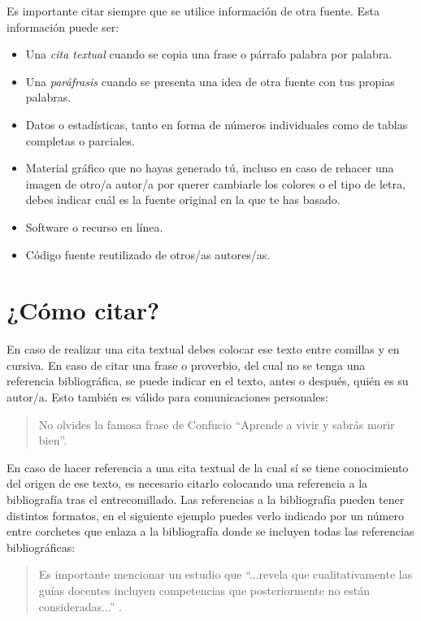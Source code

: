Es importante citar siempre que se utilice información de otra fuente. Esta información puede ser:

\begin{itemize}
    \item Una {\em cita textual} cuando se copia una frase o párrafo palabra por palabra.
    \item Una {\em paráfrasis} cuando se presenta una idea de otra fuente con tus propias palabras.
    \item Datos o estadísticas, tanto en forma de números individuales como de tablas completas o parciales.
    \item Material gráfico que no hayas generado tú, incluso en caso de rehacer una imagen de otro/a autor/a por querer cambiarle los colores o el tipo de letra, debes indicar cuál es la fuente original en la que te has basado. 
    \item Software o recurso en línea.
    \item Código fuente reutilizado de otros/as autores/as.
\end{itemize}

\section{¿Cómo citar?}

En caso de realizar una cita textual debes colocar ese texto entre comillas y en cursiva. En caso de citar una frase o proverbio, del cual no se tenga una referencia bibliográfica, se puede indicar en el texto, antes o después, quién es su autor/a. Esto también es válido para comunicaciones personales:

\begin{quote}
\begin{it}
    No olvides la famosa frase de Confucio ``Aprende a vivir y sabrás morir bien''.
\end{it}
\end{quote}

En caso de hacer referencia a una cita textual de la cual sí se tiene conocimiento del origen de ese texto, es necesario citarlo colocando una referencia a la bibliografía tras el entrecomillado. Las referencias a la bibliografía pueden tener distintos formatos, en el siguiente ejemplo puedes verlo indicado por un número entre corchetes que enlaza a la bibliografía donde se incluyen todas las referencias bibliográficas:

\begin{quote}
\begin{it}
     Es importante mencionar un estudio que ``...revela que cualitativamente las guías docentes incluyen competencias que posteriormente no están consideradas...'' \cite{fernandez2023evaluacion}.
\end{it}
\end{quote}

